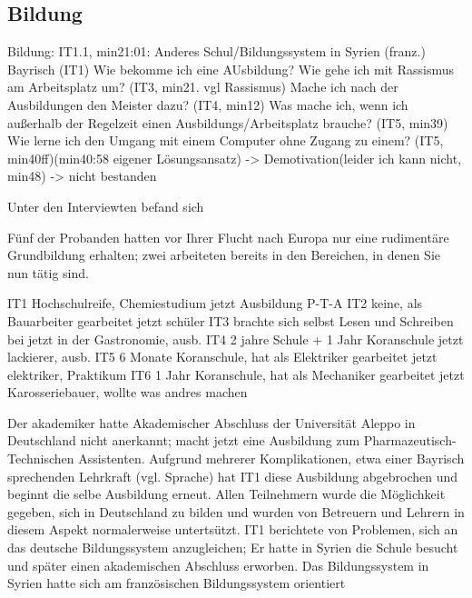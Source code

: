 
\subsection{Bildung}

Bildung:
    IT1.1, min21:01: Anderes Schul/Bildungssystem in Syrien (franz.)
    Bayrisch (IT1)
    Wie bekomme ich eine AUsbildung?
    Wie gehe ich mit Rassismus am Arbeitsplatz um? (IT3, min21. vgl Rassismus)
    Mache ich nach der Ausbildungen den Meister dazu? (IT4, min12)
    Was mache ich, wenn ich außerhalb der Regelzeit einen Ausbildungs/Arbeitsplatz brauche? (IT5, min39)
    Wie lerne ich den Umgang mit einem Computer ohne Zugang zu einem? (IT5, min40ff)(min40:58 eigener              Lösungsansatz) -> Demotivation(leider ich kann nicht, min48) -> nicht bestanden
    
Unter den Interviewten befand sich 

Fünf der Probanden hatten vor Ihrer Flucht nach Europa nur eine rudimentäre Grundbildung erhalten; zwei arbeiteten bereits in den Bereichen, in denen Sie nun tätig sind.\newline

IT1 Hochschulreife, Chemiestudium                                    jetzt Ausbildung P-T-A
IT2 keine, als Bauarbeiter gearbeitet                           jetzt schüler
IT3 brachte sich selbst Lesen und Schreiben bei                 jetzt in der Gastronomie, ausb.
IT4 2 jahre Schule + 1 Jahr Koranschule                         jetzt lackierer, ausb.
IT5 6 Monate Koranschule, hat als Elektriker gearbeitet         jetzt elektriker, Praktikum
IT6 1 Jahr Koranschule, hat als Mechaniker gearbeitet           jetzt Karosseriebauer, wollte was andres                                                                              machen

Der akademiker hatte
Akademischer Abschluss der Universität Aleppo in Deutschland nicht anerkannt; macht jetzt eine Ausbildung zum Pharmazeutisch-Technischen Assistenten. Aufgrund mehrerer Komplikationen, etwa einer Bayrisch sprechenden Lehrkraft (vgl. Sprache) hat IT1 diese Ausbildung abgebrochen und beginnt die selbe Ausbildung erneut.
Allen Teilnehmern wurde die Möglichkeit gegeben, sich in Deutschland zu bilden und wurden von Betreuern und Lehrern in diesem Aspekt normalerweise untertsützt.
IT1 berichtete von Problemen, sich an das deutsche Bildungssystem anzugleichen; Er hatte in Syrien die Schule besucht und später einen akademischen Abschluss erworben. Das Bildungssystem in Syrien hatte sich am französischen Bildungssystem orientiert
    
